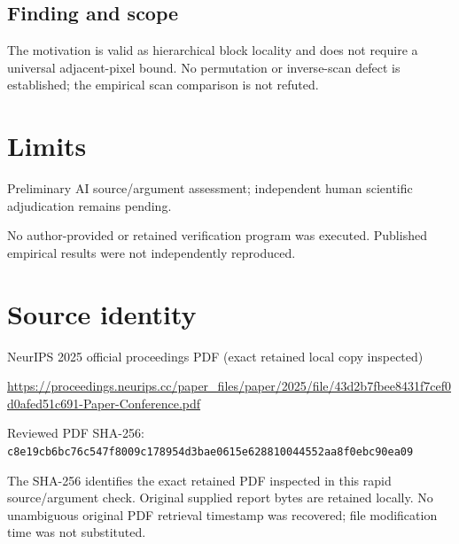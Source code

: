 \documentclass[11pt]{article}
\begin{document}
\subsection*{Finding and scope}

The motivation is valid as hierarchical block locality and does not require a universal adjacent-pixel bound. No permutation or inverse-scan defect is established; the empirical scan comparison is not refuted.

\section*{Limits}

Preliminary AI source/argument assessment; independent human scientific adjudication remains pending.\par

No author-provided or retained verification program was executed. Published empirical results were not independently reproduced.\par

\section*{Source identity}

NeurIPS 2025 official proceedings PDF (exact retained local copy inspected)

\url{https://proceedings.neurips.cc/paper_files/paper/2025/file/43d2b7fbee8431f7cef0d0afed51c691-Paper-Conference.pdf}

Reviewed PDF SHA-256: \nolinkurl{c8e19cb6bc76c547f8009c178954d3bae0615e628810044552aa8f0ebc90ea09}

The SHA-256 identifies the exact retained PDF inspected in this rapid source/argument check. Original supplied report bytes are retained locally. No unambiguous original PDF retrieval timestamp was recovered; file modification time was not substituted.
\end{document}
